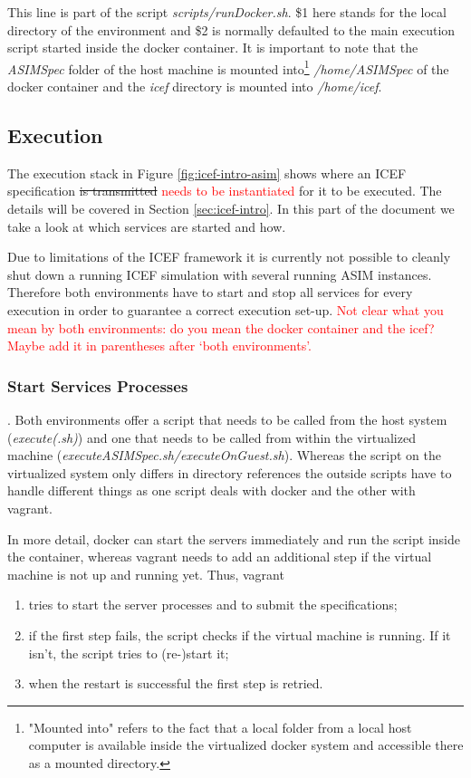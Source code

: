 This line is part of the script \textit{scripts/runDocker.sh}. \$1 here stands for the local directory of the environment and \$2 is normally defaulted to the main execution script started inside the docker container. It is important to note that the \textit{ASIMSpec} folder of the host machine is mounted into\footnote{"Mounted into" refers to the fact that a local folder from a local host computer is available inside the virtualized docker system and accessible there as a mounted directory.} \textit{/home/ASIMSpec} of the docker container and the \textit{icef} directory is mounted into \textit{/home/icef}.

\subsection{Execution}
\label{sec:env-exec-stack-exe}

The execution stack in Figure \ref{fig:icef-intro-asim} shows where an ICEF specification \st{is transmitted} \textcolor{red}{needs to be instantiated} for it to be executed. The details will be covered in Section \ref{sec:icef-intro}. In this part of the document we take a look at which services are started and how.

Due to limitations of the ICEF framework it is currently not possible to cleanly shut down a running ICEF simulation with several running ASIM instances. Therefore both environments have to start and stop all services for every execution in order to guarantee a correct execution set-up.
\textcolor{red}{Not clear what you mean by both environments: do you mean the docker container and the icef? Maybe add it in parentheses after `both environments'.}

\subsubsection{Start Services Processes}.  Both environments offer a script that needs to be called from the host system (\textit{execute(.sh)}) and one that needs to be called from within the virtualized machine (\textit{executeASIMSpec.sh/executeOnGuest.sh}). Whereas the script on the virtualized system only differs in directory references the outside scripts have to handle different things as one script deals with docker and the other with vagrant.

In more detail, docker can start the servers immediately and run the script inside the container, whereas vagrant needs to add an additional step if the virtual machine is not up and running yet. Thus, vagrant
\begin{enumerate}
\vspace{-0.5cm}
	\item tries to start the server processes and to submit the specifications;
	\item if the first step fails, the script checks if the virtual machine is running. If it isn't, the script tries to (re-)start it;
	\item when the restart is successful the first step is retried.
\end{enumerate}

